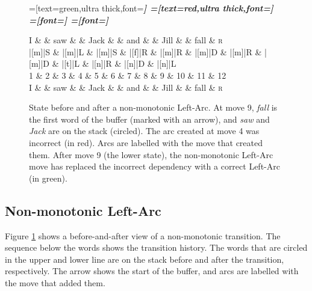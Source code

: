 \documentclass[11pt,letterpaper]{article}
\begin{document}
\begin{figure}
    \centering
    \begin{dependency}[theme=simple]
        =[text=green,ultra thick,font=\bfseries\itshape]
        =[text=red,ultra thick,font=\bfseries\itshape]
        =[font=\bfseries\itshape]
        =[font=\itshape]

        \begin{deptext}[column sep=.075cm, row sep=.1ex]
            I \&           \& saw \&          \& Jack       \& \& and     \&           \& Jill   \&  \& fall \& \textsc{r} \\
|[m]|S \& |[m]|L \& |[m]|S   \& |[f]|R \& |[m]|R \& |[m]|D \& |[m]|R \& |[m]|D \& |[t]|L \& |[n]|R \& |[n]|D \& |[n]|L \\
            1 \&     2       \& 3  \&   4      \& 5          \& 6 \& 7     \& 8 \& 9 \& 10 \& 11 \& 12 \\
    I \&           \& saw \&          \& Jack       \& \& and     \&           \& Jill   \&      \& fall \& \textsc{r} \\
        \end{deptext}
    
    
\end{dependency}
\caption{
    State before and after a non-monotonic Left-Arc.
    At move 9, \emph{fall} is the first word of the buffer (marked with an arrow),
    and \emph{saw} and \emph{Jack} are on the stack (circled). The arc created at move 4 was
    incorrect (in red). Arcs are labelled with the move that created them.
    After move 9 (the lower state), the non-monotonic Left-Arc move
    has replaced the incorrect dependency with a correct Left-Arc (in green).
\label{fig:clobber}}
\end{figure}


\subsection{Non-monotonic Left-Arc}

Figure \ref{fig:clobber} shows a before-and-after view of a non-monotonic
transition. The sequence below the words shows the transition history.
The words that are circled in the upper and lower line are on the stack before
and after the transition, respectively. The arrow shows the start of the buffer,
and arcs are labelled with the move that added them. 
\end{document}
